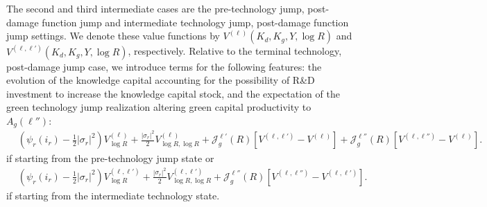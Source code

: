 \documentclass[12pt]{article}
\begin{document}
\begin{appendices}
The second and third intermediate cases are the pre-technology jump, post-damage function jump and intermediate technology jump, post-damage function jump settings. We denote these value functions by $V^{(\ell)}(K_{d}, K_{g}, Y,\log R)$ and $V^{(\ell,\ell')}(K_{d}, K_{g}, Y,\log R)$, respectively. Relative to the terminal technology, post-damage jump case, we introduce terms for the following features: the evolution of the knowledge capital accounting for the possibility of R\&D investment to increase the knowledge capital stock, and the expectation of the green technology jump realization altering green capital productivity to $A_g(\ell'')$: 
\begin{equation*}
\begin{split}
& \left(\psi_{r}(i_{r})-\frac{1}{2}|\sigma_{r}|^{2} \right) V^{(\ell)}_{\log R}+\frac{|\sigma_{r}|^{2}}{2}V^{(\ell)}_{\log R,\log R}
 + \mathcal{J}^{\ell'}_g(R) [V^{(\ell,\ell')}-V^{(\ell)}] + \mathcal{J}^{\ell''}_g(R) [V^{(\ell,\ell'')}-V^{(\ell)}].
 \end{split}
\end{equation*}
if starting from the pre-technology jump state or
\begin{equation*}
\begin{split}
& \left(\psi_{r}(i_{r})-\frac{1}{2}|\sigma_{r}|^{2} \right) V^{(\ell,\ell')}_{\log R}+\frac{|\sigma_{r}|^{2}}{2}V^{(\ell,\ell')}_{\log R,\log R}
 + \mathcal{J}^{\ell''}_g(R) [V^{(\ell,\ell'')}-V^{(\ell,\ell')}].
 \end{split}
\end{equation*} 
if starting from the intermediate technology state.



\end{appendices}
\end{document}
